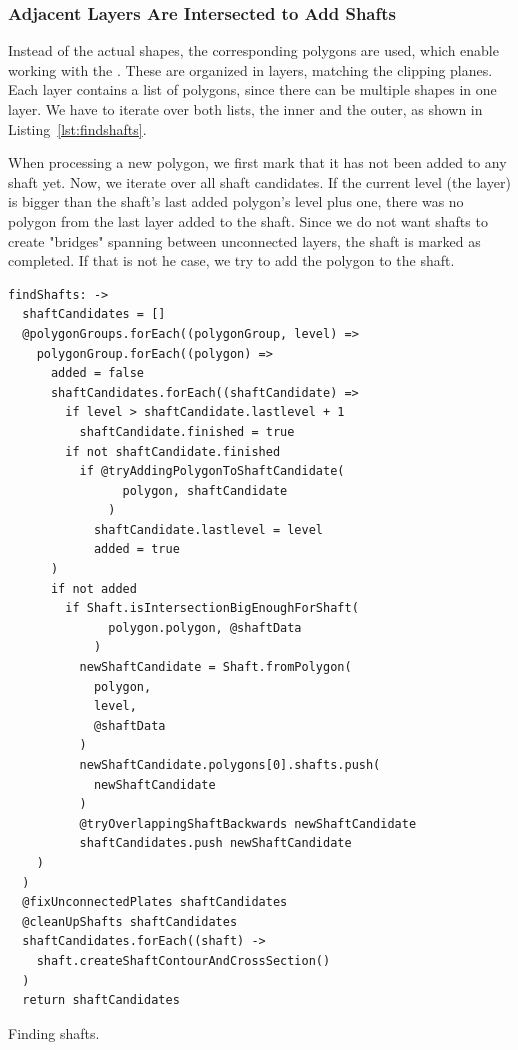 \documentclass[../ClassicThesis.tex]{subfiles}
\begin{document}
\subsubsection{Adjacent Layers Are Intersected to Add Shafts}

Instead of the actual shapes, the corresponding polygons are used, which enable working with the {\jsclipper}. These are organized in layers, matching the clipping planes. Each layer contains a list of polygons, since there can be multiple shapes in one layer. We have to iterate over both lists, the inner and the outer, as shown in Listing~\ref{lst:findshafts}.

When processing a new polygon, we first mark that it has not been added to any shaft yet. Now, we iterate over all shaft candidates. If the current level (the layer) is bigger than the shaft's last added polygon's level plus one, there was no polygon from the last layer added to the shaft. Since we do not want shafts to create "bridges" spanning between unconnected layers, the shaft is marked as completed. If that is not he case, we try to add the polygon to the shaft.

\begin{listing}
\begin{verbatim}
findShafts: ->
  shaftCandidates = []
  @polygonGroups.forEach((polygonGroup, level) =>
    polygonGroup.forEach((polygon) =>
      added = false
      shaftCandidates.forEach((shaftCandidate) =>
        if level > shaftCandidate.lastlevel + 1
          shaftCandidate.finished = true
        if not shaftCandidate.finished
          if @tryAddingPolygonToShaftCandidate(
                polygon, shaftCandidate
              )
            shaftCandidate.lastlevel = level
            added = true
      )
      if not added
        if Shaft.isIntersectionBigEnoughForShaft(
              polygon.polygon, @shaftData
            )
          newShaftCandidate = Shaft.fromPolygon(
            polygon,
            level,
            @shaftData
          )
          newShaftCandidate.polygons[0].shafts.push(
            newShaftCandidate
          )
          @tryOverlappingShaftBackwards newShaftCandidate
          shaftCandidates.push newShaftCandidate
    )
  )
  @fixUnconnectedPlates shaftCandidates
  @cleanUpShafts shaftCandidates
  shaftCandidates.forEach((shaft) ->
    shaft.createShaftContourAndCrossSection()
  )
  return shaftCandidates
\end{verbatim}
\caption{Finding shafts.}
\label{lst:findshafts}
\end{listing}
\end{document}
